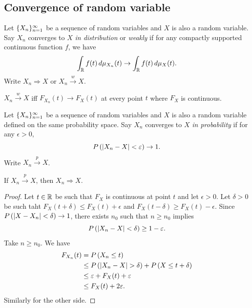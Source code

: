 \documentclass[a4paper]{article}
\newcommand{\convd}{\Rightarrow}
\newcommand{\convw}{\xrightarrow{w}}
\newcommand{\convp}{\xrightarrow{p}}
\begin{document}
\subsection{Convergence of random variable}

\begin{defi}
  Let $\{ X_n \}_{n=1}^\infty$ be a sequence of random variables and $X$ is also
  a random variable.
  Say $X_n$ converges to $X$ \emph{in distribution} or \emph{weakly} if
  for any compactly supported continuous function $f$, we have
  \[
    \int_{\mathbb{R}} f(t) \, d \mu_{X_n} (t) \to \int_{\mathbb{R}} f(t) \, d \mu_X (t).
  \]
  Write $X_n \convd X$ or $X_n \convw X$.
\end{defi}

\begin{prop}
  $X_n \convw X$ iff $F_{X_n} (t) \to F_X (t)$ at every point $t$
  where $F_X$ is continuous.
\end{prop}

\begin{defi}
  Let $\{ X_n \}_{n=1}^\infty$ be a sequence of random variables and $X$ is also
  a random variable defined on the same probability space.
  Say $X_n$ converges to $X$ \emph{in probability} if
  for any $\epsilon > 0$,
  \[
    P \left( \left\lvert X_n - X\right\rvert < \varepsilon \right) \to 1.
  \]
  Write $X_n \convp X$.
\end{defi}

\begin{prop}
  If $X_n \convp X$, then $X_n \convd X$.
\end{prop}

\begin{proof}
  Let $t \in \mathbb{R}$ be such that $F_X$ is continuous at point $t$
  and let $\epsilon > 0$. Let $\delta > 0$ be such taht
  $F_X (t + \delta) \leq F_X (t) + \epsilon$ and
  $F_X (t - \delta) \geq F_X (t) - \epsilon$.
  Since $P \left( \left\lvert X - X_n\right\rvert < \delta\right)
    \to 1$, there exists $n_0$ such that $n \geq n_0$ implies
  \[
    P \left( \left\lvert X_n - X\right\rvert < \delta\right)
    \geq 1 - \varepsilon.
  \]
  Take $n \geq n_0$. We have
  \begin{align*}
    F_{X_n} (t)
     & = P \left( X_n \leq t \right)               \\
     & \leq P \left( \left\lvert X_n - X\right\rvert > \delta\right)
    + P \left( X \leq t + \delta\right)            \\
     & \leq \varepsilon + F_X (t) + \varepsilon          \\
     & \leq F_X (t) + 2 \varepsilon.
  \end{align*}
  Similarly for the other side.

\end{proof}
\end{document}
